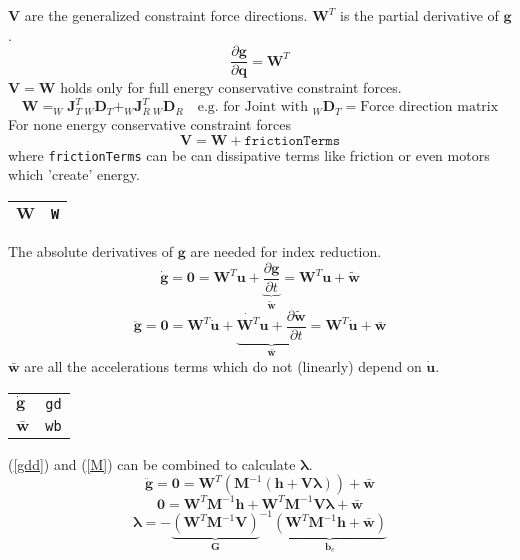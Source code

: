 \documentclass{article}
\newcommand{\bs}[1]{\boldsymbol #1}
\begin{document}
$\bs{V}$ are the generalized constraint force directions. $\bs{W}^T$ is the partial derivative of $\bs{g}$.
\begin{equation}
  \frac{\partial \bs{g}}{\partial \bs{q}}=\bs{W}^T
\end{equation}
$\bs{V}=\bs{W}$ holds only for full energy conservative constraint forces.
\begin{equation}
  \bs{W}=_W\bs{J}_T^T\,_W\bs{D}_T+_W\bs{J}_R^T\,_W\bs{D}_R \quad\text{e.g. for Joint with $_W\bs{D}_T=$Force direction matrix}
\end{equation}
For none energy conservative constraint forces
\begin{equation}
  \bs{V}=\bs{W} + \texttt{frictionTerms}
\end{equation}
where \texttt{frictionTerms} can be can dissipative terms like friction or even motors which 'create' energy.

\begin{tabular}{|l|l|}
  \hline
  $\bs{W}$ & \texttt{W} \\
  \hline
\end{tabular}

The absolute derivatives of $\bs{g}$ are needed for index reduction.
\begin{equation}
  \dot{\bs{g}}=\bs{0}=\bs{W}^T \bs{u}+\underbrace{\frac{\partial\bs{g}}{\partial t}}_{\tilde{\bs{w}}}=\bs{W}^T \bs{u}+\tilde{\bs{w}}
\end{equation}
\begin{equation}
  \ddot{\bs{g}}=\bs{0}=\bs{W}^T \dot{\bs{u}} + \underbrace{\dot{\bs{W}^T}\bs{u}+\frac{\partial\tilde{\bs{w}}}{\partial t}}_{\bar{\bs{w}}}=\bs{W}^T \dot{\bs{u}} + \bar{\bs{w}}
  \label{gdd}
\end{equation}
$\bar{\bs{w}}$ are all the accelerations terms which do not (linearly) depend on $\dot{\bs{u}}$.

\begin{tabular}{|l|l|}
  \hline
  $\dot{\bs{g}}$ & \texttt{gd} \\
  $\bar{\bs{w}}$ & \texttt{wb} \\
  \hline
\end{tabular}

(\ref{gdd}) and (\ref{M}) can be combined to calculate $\bs{\lambda}$.
\begin{equation}
  \ddot{\bs{g}}=\bs{0}=\bs{W}^T \left( \bs{M}^{-1}\left(\bs{h}+\bs{V}\bs{\lambda}\right) \right) + \bar{\bs{w}}
\end{equation}
\begin{equation}
  \bs{0}=\bs{W}^T \bs{M}^{-1}\bs{h}+\bs{W}^T \bs{M}^{-1}\bs{V}\bs{\lambda} + \bar{\bs{w}}
\end{equation}
\begin{equation}
  \bs{\lambda}=-{\underbrace{\left(\bs{W}^T \bs{M}^{-1}\bs{V}\right)}_{\bs{G}}}^{-1}\underbrace{\left( \bs{W}^T \bs{M}^{-1}\bs{h} + \bar{\bs{w}} \right)}_{\bs{b}_c}
\end{equation}
\end{document}
